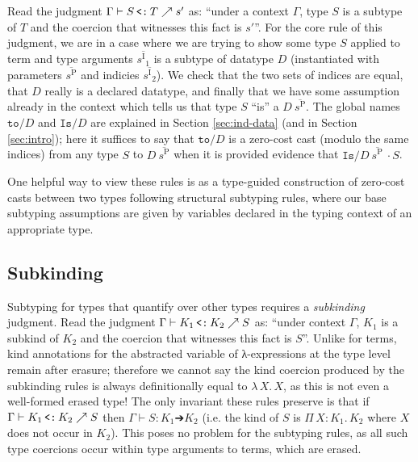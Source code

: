 \documentclass{article}
\newcommand{\abs}[4]{{#1}\, #2\! : \! #3.\, #4}
\newcommand{\absu}[3]{{#1}\, #2.\, #3}
\newcommand{\splab}[1]{\ensuremath{^{\text{#1}}}}
\newcommand{\elales}{\ensuremath{\nearrow}}
\newcommand{\vars}[1]{{\overline{#1}}}
\newcommand{\les}{\texttt{\,<:\,}}
\begin{document}
Read the judgment \(\Gamma \vdash S \les T \elales s'\) as: ``under a context
$\Gamma$, type $S$ is a subtype of $T$ and the coercion that witnesses this fact
is $s'$''. For the core rule of this judgment, we are in a case where we are
trying to show some type $S$ applied to term and type arguments
$\vars{s\splab{I}_1}$ is a subtype of datatype $D$ (instantiated with parameters
$\vars{s\splab{P}}$ and indicies $\vars{s\splab{I}_2}$). We check that the two
sets of indices are equal, that $D$ really is a declared datatype, and finally
that we have some assumption already in the context which tells us that type $S$
``is'' a $D\ \vars{s\splab{P}}$. The global names $\texttt{to/}D$ and
$\texttt{Is/}D$ are explained in Section \ref{sec:ind-data} (and in Section
\ref{sec:intro}); here it suffices to say that $\texttt{to/}D$ is a zero-cost
cast (modulo the same indices) from any type $S$ to $D\ \vars{s\splab{P}}$ when
it is provided evidence that \(\texttt{Is/}D\ \vars{s\splab{P}}\ ·S\).

One helpful way to view these rules is as a type-guided construction of
zero-cost casts between two types following structural subtyping rules, where
our base subtyping assumptions are given by variables declared in the typing
context of an appropriate type.

\subsection{Subkinding}
Subtyping for types that quantify over other types requires a
\textit{subkinding} judgment. Read the judgment \(\Gamma \vdash K_1 \les K_2
\elales S\) as: ``under context $\Gamma$, $K_1$ is a subkind of $K_2$ and the
coercion that witnesses this fact is $S$''. Unlike for terms, kind annotations
for the abstracted variable of λ-expressions at the type level remain after
erasure; therefore we cannot say the kind coercion produced by the subkinding
rules is always definitionally equal to $\absu{λ}{X}{X}$, as this is not even a
well-formed erased type! The only invariant these rules preserve is that if
$\Gamma \vdash K_1 \les K_2 \elales S$ then $\Gamma \vdash S : K_1 ➔ K_2$ (i.e.
the kind of $S$ is \(\abs{Π}{X}{K_1}{K_2}\) where $X$ does not occur in $K_2$).
This poses no problem for the subtyping rules, as all such type coercions occur
within type arguments to terms, which are erased.
\end{document}
